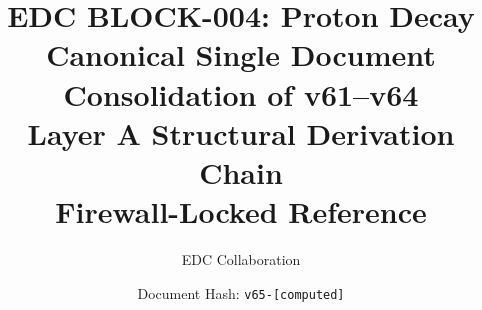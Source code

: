 \documentclass[11pt,a4paper]{article}
\theoremstyle{definition}
\begin{document}

\title{%
  \textbf{EDC BLOCK-004: Proton Decay}\\[0.5em]
  \Large Canonical Single Document\\[0.3em]
  \large Consolidation of v61--v64\\[0.3em]
  \normalsize Layer A Structural Derivation Chain\\[0.2em]
  \small Firewall-Locked Reference
}

\author{EDC Collaboration}
\date{Document Hash: \texttt{v65-[computed]}}

\maketitle
\end{document}
